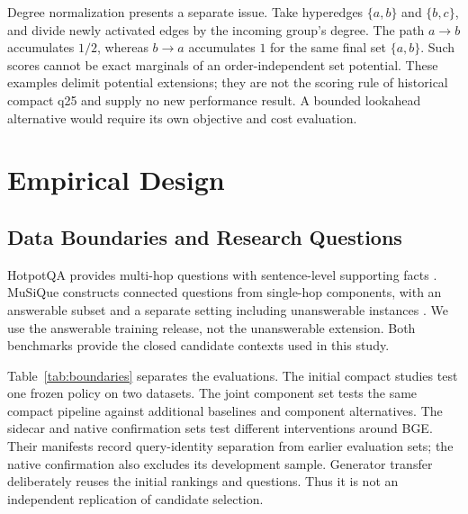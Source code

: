 \documentclass[11pt,a4paper]{article}
\begin{document}
Degree normalization presents a separate issue. Take hyperedges
$\{a,b\}$ and $\{b,c\}$, and divide newly activated edges by the incoming
group's degree. The path $a\rightarrow b$ accumulates $1/2$, whereas
$b\rightarrow a$ accumulates $1$ for the same final set $\{a,b\}$.
Such scores cannot be exact marginals of an order-independent set potential.
These examples delimit potential extensions; they are not the scoring rule
of historical compact q25 and supply no new performance result. A bounded
lookahead alternative would require its own objective and cost evaluation.

\section{Empirical Design}
\subsection{Data Boundaries and Research Questions}
HotpotQA provides multi-hop questions with sentence-level supporting facts
\citep{yang2018hotpotqa}. MuSiQue constructs connected questions from
single-hop components, with an answerable subset and a separate setting
including unanswerable instances \citep{trivedi2022musique}. We use the
answerable training release, not the unanswerable extension. Both benchmarks
provide the closed candidate contexts used in this study.

Table~\ref{tab:boundaries} separates the evaluations. The initial compact
studies test one frozen policy on two datasets. The joint component set tests
the same compact pipeline against additional baselines and component
alternatives. The sidecar and native confirmation sets test different
interventions around BGE. Their manifests record query-identity separation
from earlier evaluation sets; the native confirmation also excludes its
development sample. Generator transfer deliberately reuses the initial
rankings and questions. Thus it is not an independent replication of
candidate selection.
\end{document}
